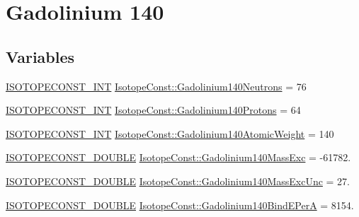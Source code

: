 \hypertarget{group___isotope_const-_gadolinium-_gd140}{}\section{Gadolinium 140}
\label{group___isotope_const-_gadolinium-_gd140}
\subsection*{Variables}
\begin{DoxyCompactItemize}
\item 
\mbox{\hyperlink{group___isotope_const-_macros_ga5f18360b3e99483a35c32d789e62621c}{I\+S\+O\+T\+O\+P\+E\+C\+O\+N\+S\+T\+\_\+\+I\+NT}} \mbox{\hyperlink{group___isotope_const-_gadolinium-_gd140_ga6fda030ad54918231758e4f58e176120}{Isotope\+Const\+::\+Gadolinium140\+Neutrons}} = 76
\item 
\mbox{\hyperlink{group___isotope_const-_macros_ga5f18360b3e99483a35c32d789e62621c}{I\+S\+O\+T\+O\+P\+E\+C\+O\+N\+S\+T\+\_\+\+I\+NT}} \mbox{\hyperlink{group___isotope_const-_gadolinium-_gd140_gaec93ae0f03365b84d3d09b6d1f717f3c}{Isotope\+Const\+::\+Gadolinium140\+Protons}} = 64
\item 
\mbox{\hyperlink{group___isotope_const-_macros_ga5f18360b3e99483a35c32d789e62621c}{I\+S\+O\+T\+O\+P\+E\+C\+O\+N\+S\+T\+\_\+\+I\+NT}} \mbox{\hyperlink{group___isotope_const-_gadolinium-_gd140_ga3976474e3f8e8f01debf6419e531f523}{Isotope\+Const\+::\+Gadolinium140\+Atomic\+Weight}} = 140
\item 
\mbox{\hyperlink{group___isotope_const-_macros_ga8f45a7272ce02c0b4c65c44636ed719a}{I\+S\+O\+T\+O\+P\+E\+C\+O\+N\+S\+T\+\_\+\+D\+O\+U\+B\+LE}} \mbox{\hyperlink{group___isotope_const-_gadolinium-_gd140_ga0beb71508d4ee28a94d39d9f02ac788c}{Isotope\+Const\+::\+Gadolinium140\+Mass\+Exc}} = -\/61782.
\item 
\mbox{\hyperlink{group___isotope_const-_macros_ga8f45a7272ce02c0b4c65c44636ed719a}{I\+S\+O\+T\+O\+P\+E\+C\+O\+N\+S\+T\+\_\+\+D\+O\+U\+B\+LE}} \mbox{\hyperlink{group___isotope_const-_gadolinium-_gd140_ga723b5d590c78775ce388ecfa863e33dc}{Isotope\+Const\+::\+Gadolinium140\+Mass\+Exc\+Unc}} = 27.
\item 
\mbox{\hyperlink{group___isotope_const-_macros_ga8f45a7272ce02c0b4c65c44636ed719a}{I\+S\+O\+T\+O\+P\+E\+C\+O\+N\+S\+T\+\_\+\+D\+O\+U\+B\+LE}} \mbox{\hyperlink{group___isotope_const-_gadolinium-_gd140_ga5974c9f9f18b427f592b447260d21c7e}{Isotope\+Const\+::\+Gadolinium140\+Bind\+E\+PerA}} = 8154.

\end{DoxyCompactItemize}
